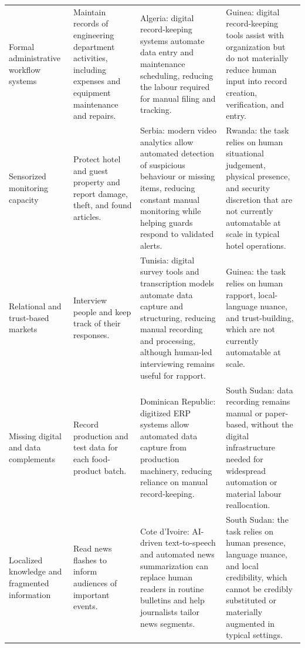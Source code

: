 {\begin{longtable}{p{}p{}p{}p{}}
Formal administrative workflow systems
& Maintain records of engineering department activities, including expenses and equipment maintenance and repairs.
& Algeria: digital record-keeping systems automate data entry and maintenance scheduling, reducing the labour required for manual filing and tracking.
& Guinea: digital record-keeping tools assist with organization but do not materially reduce human input into record creation, verification, and entry. \\

Sensorized monitoring capacity
& Protect hotel and guest property and report damage, theft, and found articles.
& Serbia: modern video analytics allow automated detection of suspicious behaviour or missing items, reducing constant manual monitoring while helping guards respond to validated alerts.
& Rwanda: the task relies on human situational judgement, physical presence, and security discretion that are not currently automatable at scale in typical hotel operations. \\

Relational and trust-based markets
& Interview people and keep track of their responses.
& Tunisia: digital survey tools and transcription models automate data capture and structuring, reducing manual recording and processing, although human-led interviewing remains useful for rapport.
& Guinea: the task relies on human rapport, local-language nuance, and trust-building, which are not currently automatable at scale. \\

Missing digital and data complements
& Record production and test data for each food-product batch.
& Dominican Republic: digitized ERP systems allow automated data capture from production machinery, reducing reliance on manual record-keeping.
& South Sudan: data recording remains manual or paper-based, without the digital infrastructure needed for widespread automation or material labour reallocation. \\

Localized knowledge and fragmented information
& Read news flashes to inform audiences of important events.
& Cote d'Ivoire: AI-driven text-to-speech and automated news summarization can replace human readers in routine bulletins and help journalists tailor news segments.
& South Sudan: the task relies on human presence, language nuance, and local credibility, which cannot be credibly substituted or materially augmented in typical settings. \\

\end{longtable}
}
